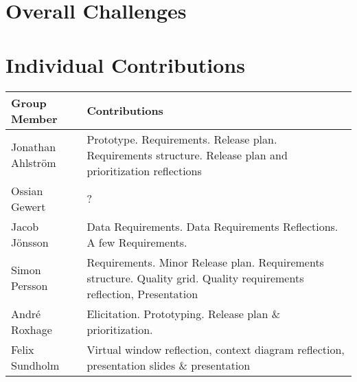 \documentclass[a4paper]{article}
\begin{document}
\section{Overall Challenges}


\section*{Individual Contributions}

\begin{tabular}{|l|p{10cm}|}
    \hline
    \textbf{Group Member} & \textbf{Contributions} \\
    \hline
    Jonathan Ahlström & Prototype. Requirements. Release plan. Requirements structure. Release plan and prioritization reflections \\
    \hline
    Ossian Gewert & ? \\
    \hline
    Jacob Jönsson & Data Requirements. Data Requirements Reflections. A few Requirements. \\
    \hline
    Simon Persson & Requirements. Minor Release plan. Requirements structure. Quality grid. Quality requirements reflection, Presentation \\
    \hline
    André Roxhage & Elicitation. Prototyping. Release plan \& prioritization. \\
    \hline
    Felix Sundholm & Virtual window reflection, context diagram reflection, presentation slides \& presentation \\
    \hline
\end{tabular}
\end{document}
